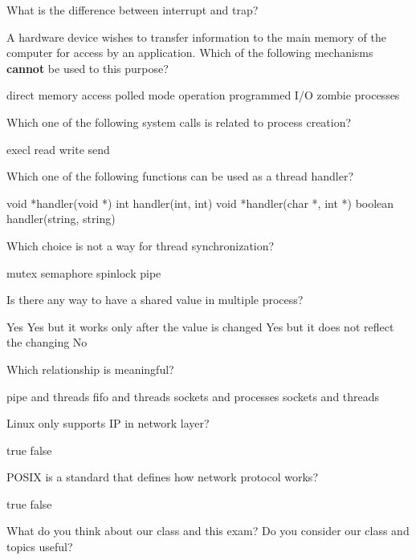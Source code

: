 \documentclass[12pt]{exam}
\begin{document}
\begin{questions}

\question[2] What is the difference between interrupt and trap?
\makeemptybox{\fill}
\addpoints

\newpage

\question[1] A hardware device wishes to transfer information to the main memory of the
computer for access by an application. Which of the following mechanisms \textbf{cannot} be used
to this purpose?
\begin{choices}
        \choice direct memory access
        \choice polled mode operation
        \choice programmed I/O
        \choice zombie processes
\end{choices}

\question[1] Which one of the following system calls is related to process creation?
\begin{choices}
        \choice execl
        \choice read
        \choice write
        \choice send
\end{choices}

\question[1] Which one of the following functions can be used as a thread handler?
\begin{choices}
        \choice void *handler(void *)
        \choice int handler(int, int)
        \choice void *handler(char *, int *)
        \choice boolean handler(string, string)
\end{choices}

\question[1] Which choice is not a way for thread synchronization?
\begin{choices}
        \choice mutex
        \choice semaphore
        \choice spinlock
        \choice pipe
\end{choices}

\question[1] Is there any way to have a shared value in multiple process?
\begin{choices}
        \choice Yes
        \choice Yes but it works only after the value is changed
        \choice Yes but it does not reflect the changing
        \choice No
\end{choices}

\question[1] Which relationship is meaningful?
\begin{choices}
        \choice pipe and threads
        \choice fifo and threads
        \choice sockets and processes
        \choice sockets and threads
\end{choices}

\newpage

\question[1] Linux only supports IP in network layer?
\begin{choices}
        \choice true
        \choice false
\end{choices}

\question[1] POSIX is a standard that defines how network protocol works?
\begin{choices}
        \choice true
        \choice false
\end{choices}

\question[0]
What do you think about our class and this exam? Do you consider our class and topics
useful?
\makeemptybox{\fill}

\end{questions}
\end{document}
